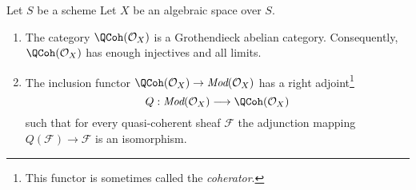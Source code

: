 \begin{proposition}
\label{proposition-coherator}
Let $S$ be a scheme Let $X$ be an algebraic space over $S$.
\begin{enumerate}
\item The category $\QCoh(\mathcal{O}_X)$ is a Grothendieck
abelian category. Consequently, $\QCoh(\mathcal{O}_X)$
has enough injectives and all limits.
\item The inclusion functor
$\QCoh(\mathcal{O}_X) \to \textit{Mod}(\mathcal{O}_X)$
has a right adjoint\footnote{This functor is sometimes called
the {\it coherator}.}
$$
Q : \textit{Mod}(\mathcal{O}_X) \longrightarrow \QCoh(\mathcal{O}_X)
$$
such that for every quasi-coherent sheaf $\mathcal{F}$ the adjunction mapping
$Q(\mathcal{F}) \to \mathcal{F}$ is an isomorphism.
\end{enumerate}
\end{proposition}

